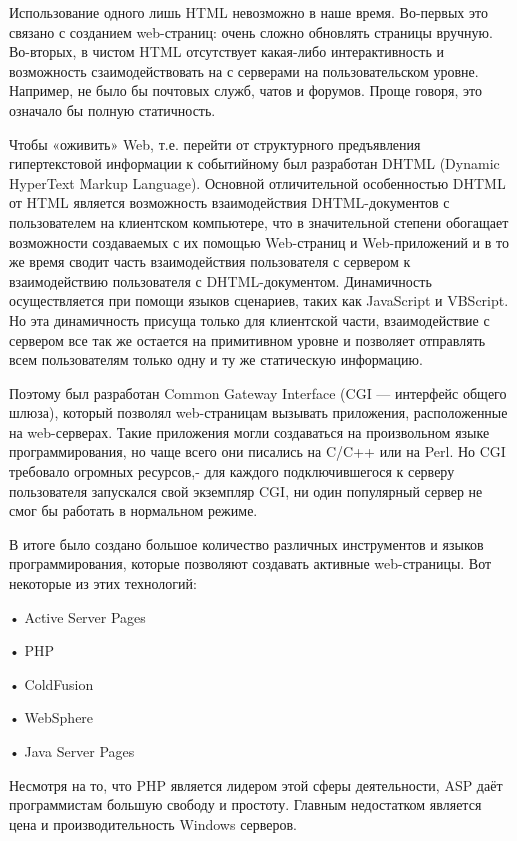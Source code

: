 \documentclass[14pt,a4paper]{extreport}
\begin{document}
	Использование одного лишь HTML невозможно в наше время. Во-первых это связано с созданием web-страниц: очень сложно обновлять страницы вручную. Во-вторых, в чистом HTML отсутствует какая-либо интерактивность и возможность сзаимодействовать на с серверами на пользовательском уровне. Например, не было бы почтовых служб, чатов и форумов. Проще говоря, это означало бы полную статичность.\par
	Чтобы «оживить» Web, т.е. перейти от структурного предъявления гипертекстовой информации к событийному был разработан DHTML (Dynamic HyperText Markup Language). Основной отличительной особенностью DHTML от HTML является возможность взаимодействия DHTML-документов с пользователем на клиентском компьютере, что в значительной степени обогащает возможности создаваемых с их помощью Web-страниц и Web-приложений и в то же время сводит часть взаимодействия пользователя с сервером к взаимодействию пользователя с DHTML-документом.
	Динамичность осуществляется при помощи языков сценариев, таких как JavaScript и VBScript. Но эта динамичность присуща только для клиентской части, взаимодействие с сервером все так же остается на примитивном уровне и позволяет отправлять всем пользователям только одну и ту же статическую информацию.\par 
	Поэтому был разработан Common Gateway Interface (CGI — интерфейс общего шлюза), который позволял web-страницам вызывать приложения, расположенные на web-серверах. Такие приложения могли создаваться на произвольном языке программирования, но чаще всего они писались на C/C++ или на Perl. Но CGI требовало огромных ресурсов,- для каждого подключившегося к серверу пользователя запускался свой экземпляр CGI, ни один популярный сервер не смог бы работать в нормальном режиме.\par
	В итоге было создано большое количество различных инструментов и языков программирования, которые позволяют создавать активные web-страницы. Вот некоторые из этих технологий:\par
	• Active Server Pages\par
	• PHP\par
	• ColdFusion\par
	• WebSphere\par
	• Java Server Pages\par	
	Несмотря на то, что PHP является лидером этой сферы деятельности, ASP даёт программистам большую свободу и простоту. Главным недостатком является цена и производительность Windows серверов.\par
	~\\
\end{document}
